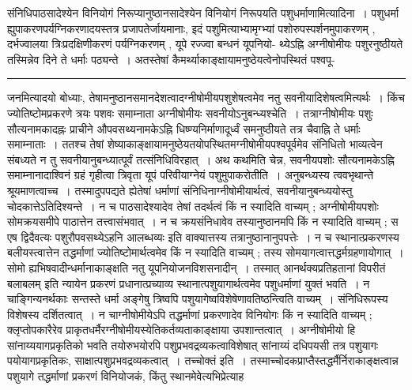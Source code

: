 \documentclass[11pt, openany]{book}
\makeatletter
\def\blfootnote{\gdef\@thefnmark{}\@footnotetext}
\makeatother
\begin{document}
 संनिधिपाठसादेश्येन विनियोगं निरूप्यानुष्ठानसादेश्येन विनियोगं निरूपयति  {\br पशुधर्माणामित्यादिना~।} पशुधर्मा ह्युपाकरणपर्यग्निकरणादयस्तत्र प्रजापतेर्जायमानाः, इदं पशुमित्याभ्यामृग्भ्यां पशोरुपस्पर्शनमुपाकरणम् , दर्भज्वालया त्रिःप्रदक्षिणीकरणं पर्यग्निकरणम् , यूपे रज्ज्वा बन्धनं यूपनियो-
\blfootnote{पाठा०\textemdash\ $^{१}$ब्रामनमस्यानस्यदेवा इति क्वचित्पाठः~।}
\newpage
\fancyhead[RE]{[अनुष्ठानसादेश्येन\textemdash\ }
{\bl\noindent थ्येऽह्नि अग्नीषोमीयः पशुरनुष्ठीयते तस्मिन्नेव दिने ते धर्माः पठ्यन्ते~। अतस्तेषां कैमर्थ्याकाङ्क्षायामनुष्ठेयत्वेनोपस्थितं पश्वपू-\\ }
\hrule
\vspace{3mm}
\noindent
जनमित्यादयो बोध्याः, तेषामनुष्ठानसमानदेशत्वादग्नीषोमीयपशुशेषत्वमेव नतु सवनीयादिशेषत्वमित्यर्थः~। किंच ज्योतिष्टोमप्रकरणे त्रयः पशवः समाम्नाता अग्नीषोमीयः सवनीयोऽनुबन्ध्यश्चेति~। तत्राग्नीषोमीयः पशुः सौत्यनामकादह्नः प्राचीने औपवसथ्यनामकेऽह्नि धिष्ण्यनिर्माणादूर्ध्वं समनुष्ठीयते तत्र चैवाह्नि ते धर्माः समाम्नाताः~। ततश्च तेषां
शेष्याकाङ्क्षायामनुष्ठेयतयोपस्थितमग्नीषोमीयपश्वपूर्वमेव संनिधितो भाव्यत्वेन संबध्यते न तु सवनीयानुबन्ध्यात्पूर्वं तत्संनिधिविरहात्~। \noindent अथ \textendash
कथमिति चेन्न, सवनीयपशोः सौत्यनामकेऽह्नि समाम्नानादाश्विनं ग्रहं गृहीत्वा त्रिवृता यूपं परिवीयाग्नेयं पशुमुपाकरोतीति~। अनुबन्ध्यस्य त्ववभृथान्ते श्रूयमाणत्वाच्च~। तस्मादुपपद्यते ह्येतेषां धर्माणां संनिधिनाग्नीषोमीयार्थत्वं, सवनीयानुबन्ध्ययोस्तु चोदकात्तेऽतिदिश्यन्ते~। न च पाठसादेश्यादेव तेषां तदर्थत्वं किं न स्यादिति वाच्यम् ;
अग्नीषोमीयपशोः सोमक्रयसमीपे पाठात्तेन तत्त्वासंभवात्~। न च क्रयसंनिधावेव तस्यानुष्ठानमपि किं न स्यादिति वाच्यम् ; {\qt स एष द्विदैवत्यः पशुरौपवसथ्येऽहनि आलब्धव्यः} इति वाक्यात्तस्य तत्रानुष्ठानानुपपत्तेः~। न च स्थानात्प्रकरणस्य बलीयस्त्वात्तेन तद्धर्माणां ज्योतिष्टोमार्थत्वमेव किं न स्यादिति वाच्यम् ; तस्य सोमयागत्वात्तद्धर्मग्रहणायोगात्~। सोमो ह्यभिषवादीन्धर्मानाकाङ्क्षति नतु यूपनियोजनविशसनादीन्~। तस्मात् {\qt आनर्थक्यप्रतिहतानां विपरीतं बलाबलम्} इति न्यायेन प्रकरणं प्रधानात्प्रच्याव्य स्थानात्पशुयागार्थत्वमेव पशुधर्माणां युक्तं भवति~। न चाङ्गिन्यनर्थकाः सन्तस्ते धर्मा अङ्गेषु त्रिष्वपि पशुयागेष्वविशेषेणावतिष्ठन्त्विति वाच्यम्~। संनिधिरूपस्य विशेषस्य दर्शितत्वात्~। न चाग्नीषोमीयेऽपि तद्धर्माणां प्रकरणादेव विनियोगः किं न स्यादिति वाच्यम् ; क्लृप्तोपकारैरेव प्राकृतधर्मैरग्नीषोमीयस्येतिकर्तव्यताकाङ्क्षाया उपशान्तत्वात्~। अग्नीषोमीयो हि सांनाय्ययागप्रकृतिको भवति तयोरुभयोरपि पशुप्रभवद्रव्यकत्वाविशेषात् सांनाय्यं दधिपयसी तत्र पशुयागः पयोयागप्रकृतिकः, साक्षात्पशुप्रभवद्रव्यकत्वात्~। तच्चोक्तं इति~। तस्माच्चोदकप्राप्तैस्तद्धर्मैर्निराकाङ्क्षत्वान्न पशुयागे तद्धर्माणां प्रकरणं विनियोजकं, किंतु स्थानमेवेत्यभिप्रेत्याह\textendash
\end{document}
